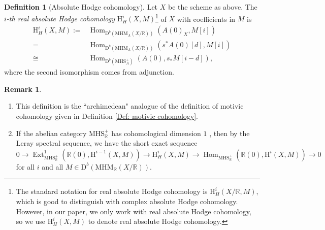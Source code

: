 \documentclass[11pt, a4paper]{amsart}
\theoremstyle{plain}
\theoremstyle{definition}
\newtheorem{definition}[theorem]{Definition}
\newtheorem{remark}[theorem]{Remark}
\numberwithin{equation}{section}
\def\RR{\mathbb{R}}
\DeclareMathOperator{\Hom}{Hom}
\DeclareMathOperator{\Ext}{Ext}
\begin{document}
\begin{definition}[Absolute Hodge cohomology]
Let $X$ be the scheme as above. The \textit{$i$-th real absolute Hodge cohomology} $\mathrm{H}^{i}_{H}(X, M)$\footnote{The standard notation for real absolute Hodge cohomology is $\mathrm{H}^{i}_{H}(X/\RR, M)$, which is good to distinguish with complex absolute Hodge cohomology. However, in our paper, we only work with real absolute Hodge cohomology, so we use $\mathrm{H}^{i}_{H}(X, M)$ to denote real absolute Hodge cohomology.} of $X$ with coefficients in $M$ is 
\begin{align*}
       \mathrm{H}^{i}_{H}(X, M) := & \Hom_{\mathrm{D}^{b}(\mathrm{MHM}_{A}(X/\RR))}(A(0)_{X}, M[i]) \\
       = & \Hom_{\mathrm{D}^{b}(\mathrm{MHM}_{A}(X/\RR))}(s^{*}A(0)[d], M[i]) \\
       \cong & \Hom_{\mathrm{D}^{b}(\mathrm{MHS}^{+}_{A})}(A(0), s_{*}M[i-d]),     
\end{align*}
where the second isomorphism comes from adjunction. 
\end{definition}

\begin{remark}
\begin{enumerate} 
    \item This definition is the ``archimedean" analogue of the definition of motivic cohomology given in Definition \ref{Def: motivic cohomology}. 
    \item If the abelian category $\mathrm{MHS}_{\RR}^{+}$ has cohomological dimension $1$ \cite[Corollary 1.10]{Bei83}, then by the Leray spectral sequence, we have the short exact sequence 
    \begin{equation}
    \label{Eq: ses for abs Hodge cohomology}
    0 \rightarrow \Ext^{1}_{\mathrm{MHS}_{\RR}^{+}}(\RR(0), \mathrm{H}^{i-1}(X,M)) \rightarrow \mathrm{H}_{H}^{i}(X,M) \rightarrow \Hom_{\mathrm{MHS}_{\RR}^{+}}(\RR(0), \mathrm{H}^{i}(X,M)) \rightarrow 0
    \end{equation}
    for all $i$ and all $M \in \mathrm{D}^{b}(\mathrm{MHM}_{\RR}(X/\RR))$. 
\end{enumerate}
\end{remark}
\end{document}
